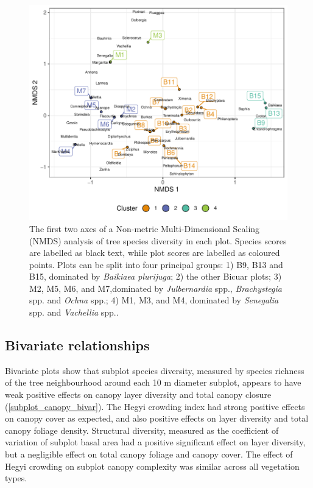 \documentclass[11pt,a4paper]{article}
\begin{document}
\begin{figure}
	\includegraphics[width=\linewidth]{nmds}
	\caption{The first two axes of a Non-metric Multi-Dimensional Scaling (NMDS) analysis of tree species diversity in each plot. Species scores are labelled as black text, while plot scores are labelled as coloured points. Plots can be split into four principal groups: 1) B9, B13 and B15, dominated by \textit{Baikiaea plurijuga}; 2) the other Bicuar plots; 3) M2, M5, M6, and M7,dominated by \textit{Julbernardia} spp., \textit{Brachystegia} spp. and \textit{Ochna} spp.; 4) M1, M3, and M4, dominated by \textit{Senegalia} spp. and \textit{Vachellia} spp..}
	\label{nmds}
\end{figure}

\subsection{Bivariate relationships}

Bivariate plots show that subplot species diversity, measured by species richness of the tree neighbourhood around each 10 m diameter subplot, appears to have weak positive effects on canopy layer diversity and total canopy closure (\autoref{subplot_canopy_bivar}). The Hegyi crowding index had strong positive effects on canopy cover as expected, and also positive effects on layer diversity and total canopy foliage density. Structural diversity, measured as the coefficient of variation of subplot basal area had a positive significant effect on layer diversity, but a negligible effect on total canopy foliage and canopy cover. The effect of Hegyi crowding on subplot canopy complexity was similar across all vegetation types. 
\end{document}
